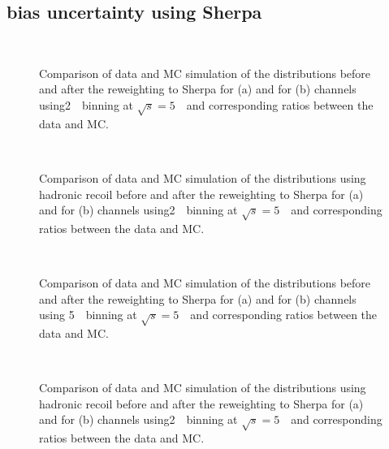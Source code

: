 \subsection{\ptz bias uncertainty using Sherpa}
\label{subsec:bias_sherpa}
\begin{figure}[h]
\centering
{}
\\
\caption{Comparison of data and MC simulation of the \ptz distributions before and after the reweighting to Sherpa for \Zee (a) and for \Zmm (b) channels using2~\GeV\ binning at $\sqrt{s} = 5$~\TeV\ and corresponding ratios between the data and MC.}
\label{fig:fit_sherpa_bias_Histmaker02_pt_5_2GeV}
\end{figure}
\begin{figure}[h]
\centering
{}
\\
\caption{Comparison of data and MC simulation of the \ptz distributions using hadronic recoil before and after the reweighting to Sherpa for \Zee (a) and for \Zmm (b) channels using2~\GeV\ binning at $\sqrt{s} = 5$~\TeV\ and corresponding ratios between the data and MC. }
\label{fig:fit_sherpa_bias_Histmaker02_ut_5_2GeV}
\end{figure}

\begin{figure}[h]
\centering
{}
\\
\caption{Comparison of data and MC simulation of the \ptz distributions before and after the reweighting to Sherpa for \Zee (a) and for \Zmm (b) channels using 5~\GeV\ binning at $\sqrt{s} = 5$~\TeV\ and corresponding ratios between the data and MC. }
\label{fig:fit_sherpa_bias_Histmaker02_pt_5_5GeV}
\end{figure}
\begin{figure}[h]
\centering
{}
\\
\caption{Comparison of data and MC simulation of the \ptz distributions using hadronic recoil before and after the reweighting to Sherpa for \Zee (a) and for \Zmm (b) channels using2~\GeV\ binning at $\sqrt{s} = 5$~\TeV\ and corresponding ratios between the data and MC. }
\label{fig:fit_sherpa_bias_Histmaker02_ut_5_5GeV}
\end{figure}

